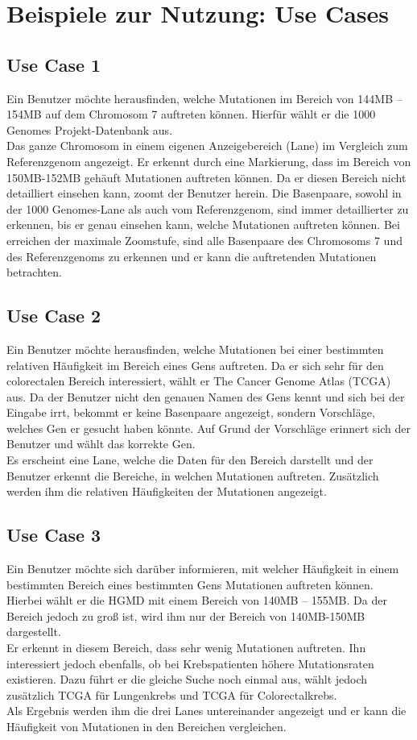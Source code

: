 \documentclass{scrartcl}
\begin{document}
\newpage
\section{Beispiele zur Nutzung: Use Cases}
\subsection{Use Case 1}
Ein Benutzer möchte herausfinden, welche Mutationen im Bereich von 144MB – 154MB auf dem Chromosom 7 auftreten können. Hierfür wählt er die 1000 Genomes Projekt-Datenbank aus. \\
Das ganze Chromosom in einem eigenen Anzeigebereich (Lane) im Vergleich zum Referenzgenom angezeigt. Er erkennt durch eine Markierung, dass im Bereich von 150MB-152MB gehäuft Mutationen auftreten können. Da er diesen Bereich nicht detailliert einsehen kann, zoomt der Benutzer herein. Die Basenpaare, sowohl in der 1000 Genomes-Lane als auch vom Referenzgenom, sind immer detaillierter zu erkennen, bis er genau einsehen kann, welche Mutationen auftreten können. Bei erreichen der maximale Zoomstufe, sind alle Basenpaare des Chromosoms 7 und des Referenzgenoms zu erkennen und er kann die auftretenden Mutationen betrachten.
\subsection{Use Case 2}
Ein Benutzer möchte herausfinden, welche Mutationen bei einer bestimmten relativen Häufigkeit im Bereich eines Gens auftreten. Da er sich sehr für den colorectalen Bereich interessiert, wählt er The Cancer Genome Atlas (TCGA) aus. Da der Benutzer nicht den genauen Namen des Gens kennt und sich bei der Eingabe irrt, bekommt er keine Basenpaare angezeigt, sondern Vorschläge, welches Gen er gesucht haben könnte. Auf Grund der Vorschläge erinnert sich der Benutzer und wählt das korrekte Gen. \\
Es erscheint eine Lane, welche die Daten für den Bereich darstellt und der Benutzer erkennt die Bereiche, in welchen Mutationen auftreten. Zusätzlich werden ihm die relativen Häufigkeiten der Mutationen angezeigt.
\subsection{Use Case 3}
Ein Benutzer möchte sich darüber informieren, mit welcher Häufigkeit in einem bestimmten Bereich eines bestimmten Gens Mutationen auftreten können. Hierbei wählt er die HGMD mit einem Bereich von 140MB – 155MB. Da der Bereich jedoch zu groß ist,
wird ihm nur der Bereich von 140MB-150MB dargestellt. \\
Er erkennt in diesem Bereich, dass sehr wenig Mutationen auftreten. Ihn interessiert jedoch ebenfalls, ob bei Krebspatienten höhere Mutationsraten existieren. Dazu führt er die gleiche Suche noch einmal aus, wählt jedoch zusätzlich TCGA für Lungenkrebs und TCGA für Colorectalkrebs. \\
Als Ergebnis werden ihm die drei Lanes untereinander angezeigt und er kann die Häufigkeit von Mutationen in den Bereichen vergleichen.
\end{document}
